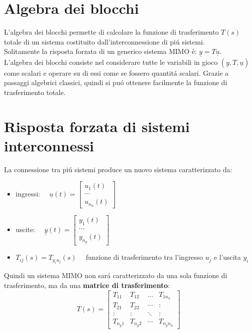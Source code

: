 \documentclass[../main.tex]{subfiles}
\begin{document}
	\newcommand{\T}[1]{T^{(#1)}(s)}
	\section{Algebra dei blocchi}
	L'algebra dei blocchi permette di calcolare la funzione di trasferimento $ T(s) $ totale di un sistema costituito dall'interconnessione di pi\'u sistemi.\\
	Solitamente la risposta forzata di un generico sistema MIMO \'e: $ \underline{y} = T \underline{u} $.\\
	L'algebra dei blocchi consiste nel considerare tutte le variabili in gioco $ (\underline{y}, T, \underline{u}) $ come scalari e operare su di essi come se fossero quantit\'a scalari. Grazie a passaggi algebrici classici, quindi si pu\'o ottenere facilmente la funzione di trasferimento totale. 
	\section{Risposta forzata di sistemi interconnessi}
	La connessione tra pi\'u sistemi produce un nuovo sistema caratterizzato da:
	\begin{itemize}
		\item ingressi: $ \quad \underline{u}(t) = \left[ \begin{array}{c}u_1(t)\\\cdots\\u_{n_u}(t)\end{array} \right] $
		\item uscite: $ \quad \underline{y}(t) = \left[ \begin{array}{c}y_1(t)\\\cdots\\y_{n_y}(t)\end{array} \right] $
		\item $ T_{ij}(s) = T_{y_i u_j}(s) \quad $ funzione di trasferimento tra l'ingresso $ u_j $ e l'uscita $ y_i $
	\end{itemize}
	Quindi un sistema MIMO non sar\'a caratterizzato da una sola funzione di trasferimento, ma da una \textbf{matrice di trasferimento}:
	\[ T(s) = \left[ \begin{array}{cccc}
	T_{11} & T_{12} & \dots & T_{1n_u} \\ 
	T_{21} & T_{22} & \cdots & \colon \\ 
	\colon & \colon & \ddots & \colon \\ 
	T_{n_y1}& T_{n_y2} & \cdots & T_{n_yn_u} 
	\end{array} \right] \]
\end{document}
